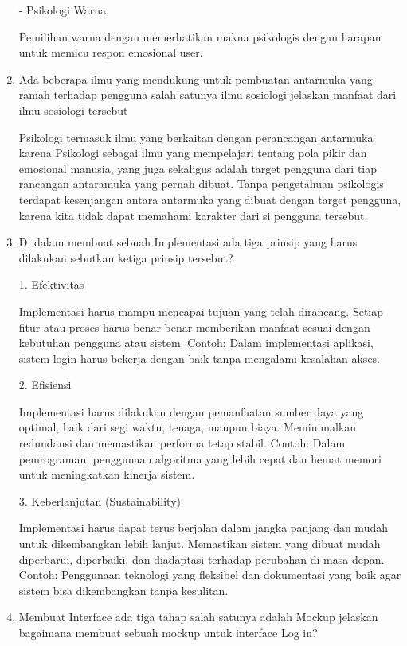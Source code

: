 \documentclass[12pt,a4paper]{article}
\begin{document}
\begin{enumerate}
    - Psikologi Warna

    Pemilihan warna dengan memerhatikan makna psikologis dengan harapan untuk
    memicu respon emosional user.

  \item Ada beberapa ilmu yang mendukung untuk pembuatan antarmuka yang ramah
    terhadap pengguna salah satunya ilmu sosiologi jelaskan manfaat dari ilmu sosiologi tersebut

    Psikologi termasuk ilmu yang berkaitan dengan perancangan antarmuka karena
    Psikologi sebagai ilmu yang mempelajari tentang pola pikir dan emosional
    manusia, yang juga sekaligus adalah target pengguna dari tiap rancangan
    antaramuka yang pernah dibuat. Tanpa pengetahuan psikologis terdapat kesenjangan
    antara antarmuka yang dibuat dengan target pengguna, karena kita tidak dapat
    memahami karakter dari si pengguna tersebut.

  \item Di dalam membuat sebuah Implementasi ada tiga prinsip yang harus
    dilakukan sebutkan ketiga prinsip tersebut?

    1. Efektivitas

    Implementasi harus mampu mencapai tujuan yang telah dirancang.
    Setiap fitur atau proses harus benar-benar memberikan manfaat sesuai dengan kebutuhan pengguna atau sistem.
    Contoh: Dalam implementasi aplikasi, sistem login harus bekerja dengan baik tanpa mengalami kesalahan akses.

    2. Efisiensi

    Implementasi harus dilakukan dengan pemanfaatan sumber daya yang optimal, baik dari segi waktu, tenaga, maupun biaya.
    Meminimalkan redundansi dan memastikan performa tetap stabil.
    Contoh: Dalam pemrograman, penggunaan algoritma yang lebih cepat dan hemat memori untuk meningkatkan kinerja sistem.

    3. Keberlanjutan (Sustainability)

    Implementasi harus dapat terus berjalan dalam jangka panjang dan mudah untuk dikembangkan lebih lanjut.
    Memastikan sistem yang dibuat mudah diperbarui, diperbaiki, dan diadaptasi terhadap perubahan di masa depan.
    Contoh: Penggunaan teknologi yang fleksibel dan dokumentasi yang baik agar sistem bisa dikembangkan tanpa kesulitan.


  \item Membuat Interface ada tiga tahap salah satunya adalah Mockup jelaskan
    bagaimana membuat sebuah mockup untuk interface Log in?


\end{enumerate}
\end{document}
